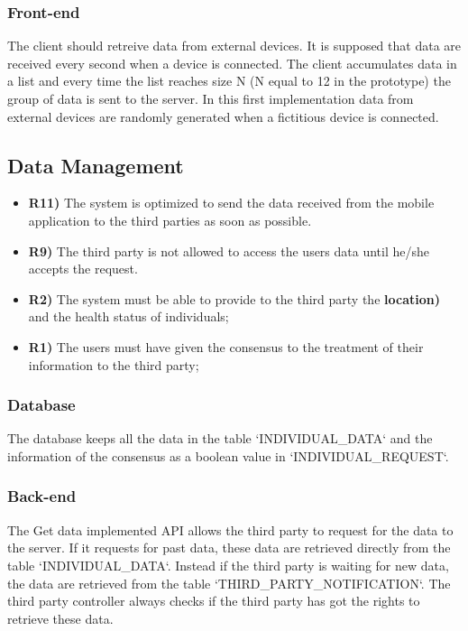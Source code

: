 \subsubsection*{Front-end}
The client should retreive data from external devices. It is supposed that data are received every second when a device is connected. The client accumulates data in a list and every time the list reaches size N (N equal to 12 in the prototype) the group of data is sent to the server.
In this first implementation data from external devices are randomly generated when a fictitious device is connected.


\subsection{Data Management}
\begin{itemize}	
	\item {\color{Green}\textbf{R11)}} The system is optimized to send the data received from the mobile application to the third parties as soon as possible.
	\item {\color{Green}\textbf{R9)}} The third party is not allowed to access the users data until he/she accepts the request.
	\item {\color{Green}\textbf{R2)}} The system must be able to provide to the third party the {\color{Red}\textbf{location)}} and the health status of individuals;
	\item {\color{Green}\textbf{R1)}} The users must have given the consensus to the treatment of their information to the third party;
\end{itemize}

\subsubsection*{Database}
The database keeps all the data in the table `INDIVIDUAL\_DATA` and the information of the consensus as a boolean value in `INDIVIDUAL\_REQUEST`.

\subsubsection*{Back-end}
The Get data implemented API allows the third party to request for the data to the server. If it requests for past data, these data are retrieved directly from the table `INDIVIDUAL\_DATA`. Instead if the third party is waiting for new data, the data are retrieved from the table `THIRD\_PARTY\_NOTIFICATION`. The third party controller always checks if the third party has got the rights to retrieve these data.

